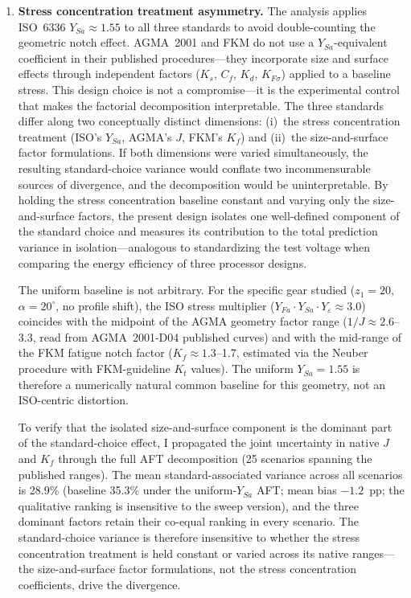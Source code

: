 \documentclass[12pt,a4paper]{article}
\begin{document}
\begin{enumerate}
  \item \textbf{Stress concentration treatment asymmetry.} The analysis
        applies ISO~6336 $Y_{Sa} \approx 1.55$ to all three standards to
        avoid double-counting the geometric notch effect. AGMA~2001
        and FKM do not use a $Y_{Sa}$-equivalent coefficient in their
        published procedures---they incorporate size and surface effects
        through independent factors ($K_s$, $C_f$, $K_d$, $K_{F\sigma}$)
        applied to a baseline stress. This design choice is not a
        compromise---it is the experimental control that makes the
        factorial decomposition interpretable. The three standards differ
        along two conceptually distinct dimensions: (i)~the stress
        concentration treatment (ISO's $Y_{Sa}$, AGMA's $J$, FKM's
        $K_f$) and (ii)~the size-and-surface factor formulations. If both
        dimensions were varied simultaneously, the resulting
        standard-choice variance would conflate two incommensurable sources
        of divergence, and the decomposition would be uninterpretable. By
        holding the stress concentration baseline constant and varying only
        the size-and-surface factors, the present design isolates one
        well-defined component of the standard choice and measures its
        contribution to the total prediction variance in
        isolation---analogous to standardizing the test voltage when
        comparing the energy efficiency of three processor designs.

        The uniform baseline is not arbitrary. For the specific gear
        studied ($z_1=20$, $\alpha=20^\circ$, no profile shift), the
        ISO stress multiplier ($Y_{Fa} \cdot Y_{Sa} \cdot Y_\varepsilon
        \approx 3.0$) coincides with the midpoint of the AGMA geometry
        factor range ($1/J \approx 2.6$--3.3, read from AGMA~2001-D04
        published curves) and with the mid-range of the FKM fatigue notch
        factor ($K_f \approx 1.3$--1.7, estimated via the Neuber
        procedure with FKM-guideline $K_t$ values). The uniform
        $Y_{Sa}=1.55$ is therefore a numerically natural common baseline
        for this geometry, not an ISO-centric distortion.

        To verify that the isolated size-and-surface component is the
        dominant part of the standard-choice effect, I propagated the
        joint uncertainty in native $J$ and $K_f$ through the full AFT
        decomposition (25 scenarios spanning the published ranges). The
        mean standard-associated variance across all scenarios is 28.9\%
        (baseline 35.3\% under the uniform-$Y_{Sa}$ AFT; mean bias
$-1.2$~pp; the qualitative ranking is insensitive to the sweep
version), and the three dominant
        factors retain their co-equal ranking in every scenario. The
        standard-choice variance is therefore insensitive to whether the
        stress concentration treatment is held constant or varied across
        its native ranges---the size-and-surface factor formulations, not
        the stress concentration coefficients, drive the divergence.


\end{enumerate}
\end{document}
